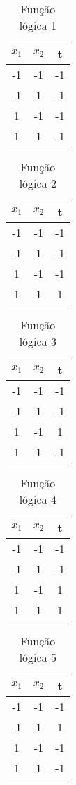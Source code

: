 \begin{table}[H]
\centering
\begin{tabular}{|c|c|c|}
\hline
 $x_1$ & $x_2$ & t\\ \hline
 -1 & -1 & -1\\ \hline
 -1 & 1 & -1\\ \hline
 1 & -1 & -1\\ \hline
 1 & 1 & -1\\ \hline
\end{tabular}
\caption{Função lógica 1}\label{tab:1}\end{table}

\begin{table}[H]
\centering
\begin{tabular}{|c|c|c|}
\hline
 $x_1$ & $x_2$ & t\\ \hline
 -1 & -1 & -1\\ \hline
 -1 & 1 & -1\\ \hline
 1 & -1 & -1\\ \hline
 1 & 1 & 1\\ \hline
\end{tabular}
\caption{Função lógica 2}\label{tab:2}\end{table}

\begin{table}[H]
\centering
\begin{tabular}{|c|c|c|}
\hline
 $x_1$ & $x_2$ & t\\ \hline
 -1 & -1 & -1\\ \hline
 -1 & 1 & -1\\ \hline
 1 & -1 & 1\\ \hline
 1 & 1 & -1\\ \hline
\end{tabular}
\caption{Função lógica 3}\label{tab:3}\end{table}

\begin{table}[H]
\centering
\begin{tabular}{|c|c|c|}
\hline
 $x_1$ & $x_2$ & t\\ \hline
 -1 & -1 & -1\\ \hline
 -1 & 1 & -1\\ \hline
 1 & -1 & 1\\ \hline
 1 & 1 & 1\\ \hline
\end{tabular}
\caption{Função lógica 4}\label{tab:4}\end{table}

\begin{table}[H]
\centering
\begin{tabular}{|c|c|c|}
\hline
 $x_1$ & $x_2$ & t\\ \hline
 -1 & -1 & -1\\ \hline
 -1 & 1 & 1\\ \hline
 1 & -1 & -1\\ \hline
 1 & 1 & -1\\ \hline
\end{tabular}
\caption{Função lógica 5}\label{tab:5}\end{table}

